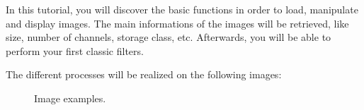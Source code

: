 \def\difficulty{1}


\begin{note}
In this tutorial, you will discover the basic functions in order to load, manipulate and  display images. The main informations of the images will be retrieved, like size, number of channels, storage class, etc. Afterwards, you will be able to perform your first classic filters.
\end{note}

\noindent The different processes will be realized on the following images:

\vspace*{-8pt}
\begin{figure}[htbp]
\centering\caption{Image examples.}
\hfill
{}
\hfill
{}
\vspace*{-10pt}
\end{figure}

\vspace*{-15pt}


